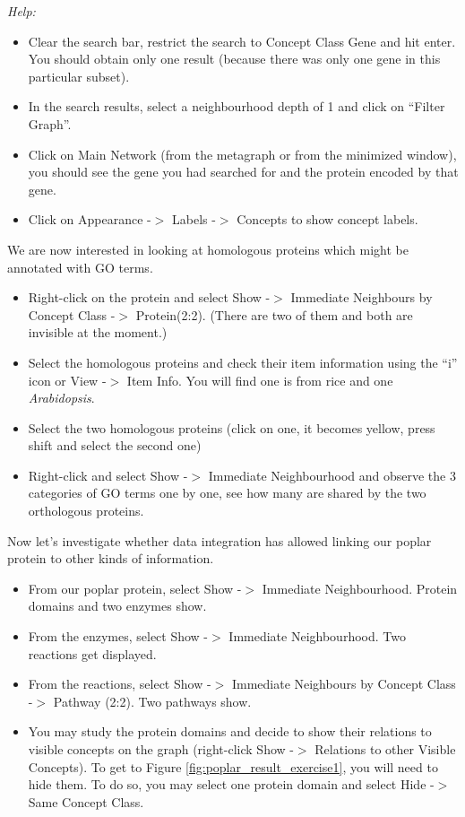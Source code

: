 \emph{Help:} 
\begin{itemize}
\item Clear the search bar, restrict the search to Concept Class Gene and hit enter. You should obtain only one result (because there was only one gene in this particular subset).
\item In the search results, select a neighbourhood depth of 1 and click on ``Filter Graph''.
\item Click on Main Network (from the metagraph or from the minimized window), you should see the gene you had searched for and the protein encoded by that gene.
\item Click on Appearance -$>$ Labels -$>$ Concepts to show concept labels.
\end{itemize}

We are now interested in looking at homologous proteins which might be annotated with GO terms.
\begin{itemize}
\item Right-click on the protein and select Show -$>$ Immediate Neighbours by Concept Class -$>$ Protein(2:2). (There are two of them and both are invisible at the moment.)
\item Select the homologous proteins and check their item information using the ``i'' icon or View -$>$ Item Info. You will find one is from rice and one {\it{Arabidopsis}}.
\item Select the two homologous proteins (click on one, it becomes yellow, press shift and select the second one)
\item Right-click and select Show -$>$ Immediate Neighbourhood and observe the 3 categories of GO terms one by one, see how many are shared by the two orthologous proteins.
\end{itemize}

Now let's investigate whether data integration has allowed linking our poplar protein to other kinds of information.
\begin{itemize}
\item From our poplar protein, select Show -$>$ Immediate Neighbourhood. Protein domains and two enzymes show.
\item From the enzymes, select Show -$>$ Immediate Neighbourhood. Two reactions get displayed.
\item From the reactions, select Show -$>$ Immediate Neighbours by Concept Class -$>$ Pathway (2:2). Two pathways show.
\item You may study the protein domains and decide to show their relations to visible concepts on the graph (right-click Show -$>$ Relations to other Visible Concepts).
To get to Figure \ref{fig:poplar_result_exercise1}, you will need to hide them. 
To do so, you may select one protein domain and select Hide -$>$ Same Concept Class.
\end{itemize}

